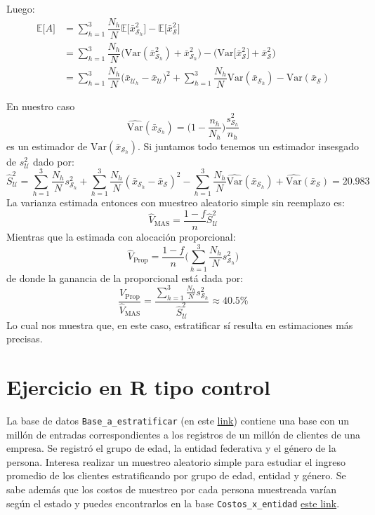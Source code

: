 \documentclass[
]{book}
\begin{document}
Luego:
\begin{equation}\nonumber
\begin{aligned}
\mathbb{E}\big[A\big] & = \sum\limits_{h = 1}^3 \dfrac{N_h}{N} \mathbb{E}\big[\bar{x}_{\mathcal{S}_h}^2\big] - \mathbb{E}\big[\bar{x}_{\mathcal{S}}^2\big] \\
& = \sum\limits_{h = 1}^3 \dfrac{N_h}{N} \Big( \textrm{Var}(\bar{x}_{\mathcal{S}_h}^2) + \bar{x}_{\mathcal{S}_h}^2 \Big) - \Big( \textrm{Var}\big[\bar{x}_{\mathcal{S}}^2\big] + \bar{x}_{\mathcal{S}}^2\Big)\\
& = \sum\limits_{h = 1}^3 \dfrac{N_h}{N} \Big( \bar{x}_{\mathcal{U}_h} - \bar{x}_{\mathcal{U}}\Big)^2 + \sum\limits_{h = 1}^3 \dfrac{N_h}{N} \textrm{Var}(\bar{x}_{\mathcal{S}_h}) - \textrm{Var}(\bar{x}_{\mathcal{S}})
\end{aligned}
\end{equation}

En nuestro caso
\[
\widehat{\text{Var}}(\bar{x}_{\mathcal{S}_h}) = \Big( 1 - \frac{n_h}{N_h}\Big) \frac{s^2_{\mathcal{S}_h}}{n_h}
\]
es un estimador de \(\textrm{Var}(\bar{x}_{\mathcal{S}_h})\). Si juntamos todo tenemos un estimador insesgado de \(s^2_{\mathcal{U}}\) dado por:
\[
\hat{S}^2_{\mathcal{U}} = \sum\limits_{h = 1}^3 \dfrac{N_h}{N} s^2_{\mathcal{S}_h} + \sum\limits_{h = 1}^3 \dfrac{N_h}{N} (\bar{x}_{\mathcal{S}_h} - \bar{x}_{\mathcal{S}})^2 -  \sum\limits_{h = 1}^3 \dfrac{N_h}{N} \widehat{\textrm{Var}}(\bar{x}_{\mathcal{S}_h}) +  \widehat{\textrm{Var}}(\bar{x}_{\mathcal{S}}) = 20.983
\]
La varianza estimada entonces con muestreo aleatorio simple sin reemplazo es:
\[
\widehat{V}_{\text{MAS}} = \frac{1-f}{n} \hat{S}^2_{\mathcal{U}}
\]
Mientras que la estimada con alocación proporcional:
\[
\widehat{V}_{\text{Prop}} = \frac{1-f}{n} \Big( \sum\limits_{h = 1}^3 \frac{N_h}{N} s^2_{\mathcal{S}_h}\Big)
\]
de donde la ganancia de la proporcional está dada por:
\[
\dfrac{\widehat{V}_{\text{Prop}}}{\widehat{V}_{\text{MAS}}} = \dfrac{\sum\limits_{h = 1}^3 \frac{N_h}{N} s^2_{\mathcal{S}_h}}{\hat{S}^2_{\mathcal{U}}} \approx 40.5\%
\]
Lo cual nos muestra que, en este caso, estratificar sí resulta en estimaciones más precisas.

\hypertarget{ejercicio-en-r-tipo-control}{%
\section{Ejercicio en R tipo control}\label{ejercicio-en-r-tipo-control}}

La base de datos \texttt{Base\_a\_estratificar} (en este \href{https://www.dropbox.com/s/q4j8iaqzp4fv6oa/Base_a_estratificar.RDS?dl=0}{link}) contiene una base con un millón de entradas correspondientes a los registros de un millón de clientes de una empresa. Se registró el grupo de edad, la entidad federativa y el género de la persona. Interesa realizar un muestreo aleatorio simple para estudiar el ingreso promedio de los clientes estratificando por grupo de edad, entidad y género. Se sabe además que los costos de muestreo por cada persona muestreada varían según el estado y puedes encontrarlos en la base \texttt{Costos\_x\_entidad} \href{https://www.dropbox.com/s/dq5r7xqpdt9l2e3/Costos_x_entidad.RDS?dl=0}{este link}.
\end{document}
